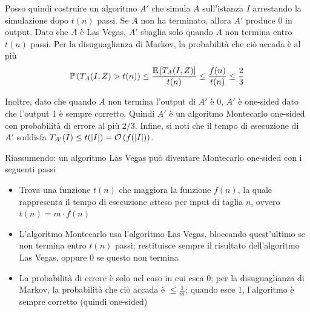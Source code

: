 Posso quindi costruire un algoritmo $A'$ che simula $A$ sull'istanza $I$ arrestando la simulazione dopo $t(n)$ passi. Se $A$ non ha terminato, allora $A'$ produce 0 in output. Dato che $A$ è Las Vegas, $A'$ sbaglia solo quando $A$ non termina entro $t(n)$ passi. Per la disuguaglianza di Markov, la probabilità che ciò accada è al più
$$ \mathbb{P} \left(T_A (I, Z) > t(n)\right) \leq \frac{\mathbb{E} \left[T_A (I,Z)\right]}{t(n)} \leq \frac{f(n)}{t(n)} \leq \frac{2}{3} $$

Inoltre, dato che quando $A$ non termina l'output di $A'$ è 0, $A'$ è one-sided dato che l'output 1 è sempre corretto. Quindi $A'$ è un algoritmo Montecarlo one-sided con probabilità di errore al più $2/3$. Infine, si noti che il tempo di esecuzione di $A'$ soddisfa $T_{A'} (I) \leq t(|I|) = \mathcal{O} \left(f(|I|)\right)$.

\vfill

Riassumendo: un algoritmo Las Vegas può diventare Montecarlo one-sided con i seguenti passi
\begin{itemize}
    \item Trova una funzione $t(n)$ che maggiora la funzione $f(n)$, la quale rappresenta il tempo di esecuzione atteso per input di taglia $n$, ovvero $t(n) = m \cdot f(n)$

    \item L'algoritmo Montecarlo usa l'algoritmo Las Vegas, bloccando quest'ultimo se non termina entro $t(n)$ passi; restituisce sempre il risultato dell'algoritmo Las Vegas, oppure 0 se questo non termina

    \item La probabilità di errore è solo nel caso in cui esca 0; per la disuguaglianza di Markov, la probabilità che ciò accada è $\leq \frac{1}{m}$; quando esce 1, l'algoritmo è sempre corretto (quindi one-sided)
\end{itemize}

